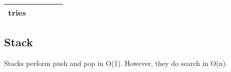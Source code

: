 \begin{table}[ht]
\begin{tabularx}{1.2\textwidth}{@{}rllll@{}}
		\multicolumn{1}{r|}{\textbf{tries}}       &                                                                        &                                                                                                     &                                                                      &                                                                                                                                                                                                                                      \\
		\bottomrule
	\end{tabularx}
\end{table}


\subsection{Stack}

Stacks perform push and pop in O(1).
However, they do search in O(n).

